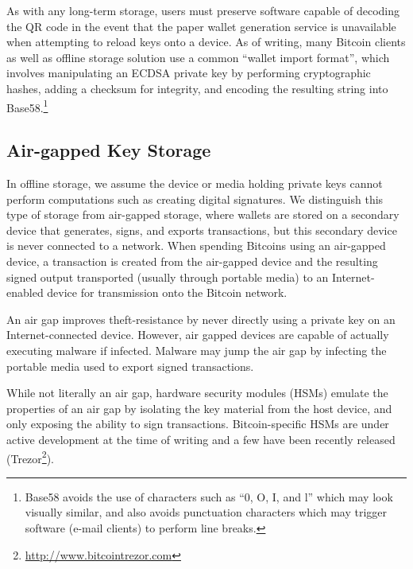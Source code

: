 
As with any long-term storage, users must preserve software capable of decoding the QR code in the event that the paper wallet generation service is unavailable when attempting to reload keys onto a device. As of writing, many Bitcoin clients as well as offline storage solution use a common ``wallet import format'', which involves manipulating an ECDSA private key by performing cryptographic hashes, adding a checksum for integrity, and encoding the resulting string into Base58.\footnote{Base58 avoids the use of characters such as ``0, O, I, and l'' which may look visually similar, and also avoids punctuation characters which may trigger software (\eg e-mail clients) to perform line breaks.}

\subsection{Air-gapped Key Storage}
In offline storage, we assume the device or media holding private keys cannot perform computations such as creating digital signatures. We distinguish this type of storage from air-gapped storage, where wallets are stored on a secondary device that generates, signs, and exports transactions, but this secondary device is never connected to a network. When spending Bitcoins using an air-gapped device, a transaction is created from the air-gapped device and the resulting signed output transported (usually through portable media) to an Internet-enabled device for transmission onto the Bitcoin network. 

An air gap improves theft-resistance by never directly using a private key on an Internet-connected device. However, air gapped devices are capable of actually executing malware if infected. Malware may jump the air gap by infecting the portable media used to export signed transactions.

While not literally an air gap, hardware security modules (HSMs) emulate the properties of an air gap by isolating the key material from the host device, and only exposing the ability to sign transactions. Bitcoin-specific HSMs are under active development at the time of writing and a few have been recently released (\eg Trezor\footnote{\url{http://www.bitcointrezor.com}}).

